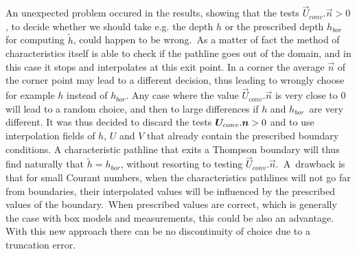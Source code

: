 An unexpected problem occured in the results, showing that the tests $%
\vec{U}_{conv}.\vec{n}>0$, to decide whether we should
take e.g. the depth $h$ or the prescribed depth $h_{bor}$ for computing $%
\widetilde{h}$, could happen to be wrong.\ As a matter of fact the method of
characteristics itself is able to check if the pathline goes out of the
domain, and in this case it stops and interpolates at this exit point. In a
corner the average $\vec{n}$ of the corner point may lead to a
different decision, thus leading to wrongly choose for example $h$ instead
of $h_{bor}$. Any case where the value $\vec{U}_{conv}.%
\vec{n}$ is very close to 0 will lead to a random choice, and
then to large differences if $h$ and $h_{bor}$\ are very different. It was
thus decided to discard the tests $\vec{U}_{conv}.\vec{%
n}>0$ and to use interpolation fields of $h$, $U$ and $V$ that already
contain the prescribed boundary conditions. A characteristic pathline that
exits a Thompson boundary will thus find naturally that $\widetilde{h}%
=h_{bor}$, without resorting to testing $\vec{U}_{conv}.%
\vec{n}$.\ A\ drawback is that for small Courant numbers, when
the characteristics pathlines will not go far from boundaries, their
interpolated values will be influenced by the prescribed values of the
boundary.\ When prescribed values are correct, which is generally the case
with box models and measurements, this could be also an advantage. With this
new approach there can be no discontinuity of choice due to a truncation
error.